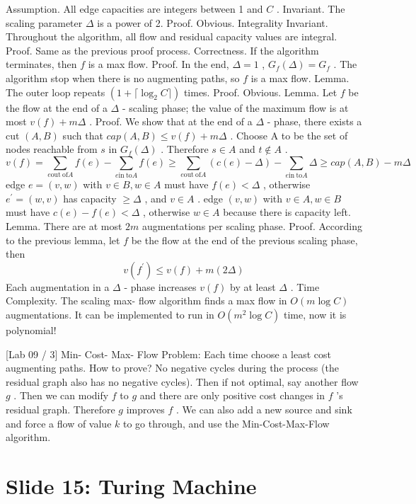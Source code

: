 \documentclass[10pt,a4paper]{article}
\begin{document}
Assumption. All edge capacities are integers between 1 and \(C\) .
Invariant. The scaling parameter \(\Delta\) is a power of 2.
Proof. Obvious.
Integrality Invariant. Throughout the algorithm, all flow and residual capacity values are integral.
Proof. Same as the previous proof process.
Correctness. If the algorithm terminates, then \(f\) is a max flow.
Proof. In the end, \(\Delta = 1\) , \(G_{f}(\Delta) = G_{f}\) . The algorithm stop when there is no augmenting paths, so \(f\) is a max flow.
Lemma. The outer loop repeats \((1 + \lceil \log_{2}C\rceil)\) times.
Proof. Obvious.
Lemma. Let \(f\) be the flow at the end of a \(\Delta\) - scaling phase; the value of the maximum flow is at most \(v(f) + m\Delta\) .
Proof. We show that at the end of a \(\Delta\) - phase, there exists a cut \((A,B)\) such that \(cap(A,B) \leq v(f) + m\Delta\) . Choose A to be the set of nodes reachable from \(s\) in \(G_{f}(\Delta)\) . Therefore \(s \in A\) and \(t \notin A\) .
\[
v(f) = \sum_{e\mathrm{out\ of}A}f(e) - \sum_{e\mathrm{in\ to}A}f(e)\geq \sum_{e\mathrm{out\ of}A}(c(e) - \Delta) - \sum_{e\mathrm{in\ to}A}\Delta \geq cap(A,B) - m\Delta
\]
edge \(e = (v,w)\) with \(v\in B,w\in A\) must have \(f(e)< \Delta\) , otherwise \(e^{\prime} = (w,v)\) has capacity \(\geq \Delta\) , and \(v\in A\) .
edge \((v,w)\) with \(v\in A,w\in B\) must have \(c(e) - f(e)< \Delta\) , otherwise \(w\in A\) because there is capacity left.
Lemma. There are at most \(2m\) augmentations per scaling phase.
Proof. According to the previous lemma, let \(f\) be the flow at the end of the previous scaling phase, then
\[
v(f^{\prime})\leq v(f) + m(2\Delta)
\]
Each augmentation in a \(\Delta\) - phase increases \(v(f)\) by at least \(\Delta\) .
Time Complexity. The scaling max- flow algorithm finds a max flow in \(O(m\log C)\) augmentations. It can be implemented to run in \(O(m^{2}\log C)\) time, now it is polynomial!

[Lab 09 / 3] Min- Cost- Max- Flow Problem: Each time choose a least cost augmenting paths. How to prove? No negative cycles during the process (the residual graph also has no negative cycles). Then if not optimal, say another flow \(g\) . Then we can modify \(f\) to \(g\) and there are only positive cost changes in \(f\) 's residual graph. Therefore \(g\) improves \(f\) . We can also add a new source and sink and force a flow of value \(k\) to go through, and use the Min-Cost-Max-Flow algorithm.

\section*{Slide 15: Turing Machine}
\end{document}
